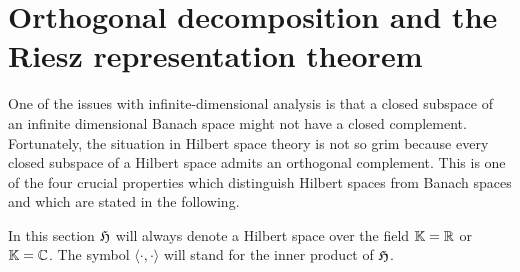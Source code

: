 %
\section{Orthogonal decomposition and the Riesz representation theorem}
  
\para 
One of the issues with infinite-dimensional analysis is that a closed subspace of an infinite dimensional Banach space might not have a 
closed complement. Fortunately, the situation in Hilbert space theory is not so grim because 
every closed subspace of a Hilbert space admits an orthogonal complement. This is one of the four 
crucial properties  which distinguish Hilbert spaces from Banach spaces and which are stated in the following. 

In this section $\mathfrak{H}$ will always denote a Hilbert space over the field $\mathbb{K}=\mathbb{R}$ or $\mathbb{K}=\mathbb{C}$. 
The symbol $\langle \cdot , \cdot\rangle$ will stand for the inner product of $\mathfrak{H}$. 

